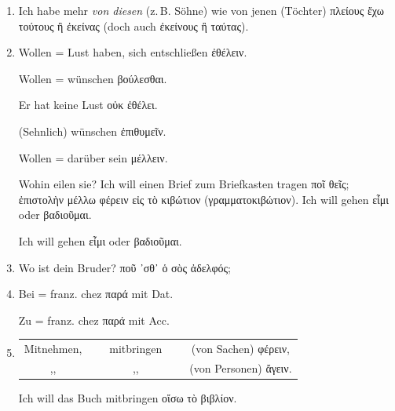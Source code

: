 \begin{enumerate}[leftmargin=0pt,rightmargin=0pt,listparindent =1cm,labelindent=1cm,labelsep=1ex,labelwidth={*},itemindent={*},align=left]
\item Ich habe mehr \emph{von diesen} (z.\,B. Söhne) wie von jenen (Töchter)
\textgreek[variant=ancient]{πλείους ἔχω τούτους ἢ ἐκείνας} (doch auch
\textgreek[variant=ancient]{ἐκείνους ἢ ταύτας}).
\item Wollen = Lust haben, sich entschließen \textgreek[variant=ancient]{ἐθέλειν.}


\begin{continuousitemline}Wollen = wünschen \textgreek[variant=ancient]{βούλεσθαι.}


Er hat keine Lust \textgreek[variant=ancient]{οὐκ ἐθέλει.}


(Sehnlich) wünschen \textgreek[variant=ancient]{ἐπιθυμεῖν. }


Wollen = darüber sein \textgreek[variant=ancient]{μέλλειν.}\par\end{continuousitemline}


Wohin eilen sie? Ich will einen Brief zum Briefkasten tragen \textgreek[variant=ancient]{ποῖ
θεῖς; ἐπιστολὴν μέλλω φέρειν εἰς τὸ κιβώτιον (γραμματοκιβώτιον). Ich
will gehen εἶμι oder βαδιοῦμαι.} 


\begin{continuousitemline}Ich will gehen \textgreek[variant=ancient]{εἶμι}
oder \textgreek[variant=ancient]{βαδιοῦμαι.}\par\end{continuousitemline}

\item Wo ist dein Bruder? \textgreek[variant=ancient]{ποῦ ᾽σθ᾽ ὁ σὸς ἀδελφός;}
\item Bei = franz. \textfrench{chez} \textgreek[variant=ancient]{παρά} mit
\textlatin{Dat.}


\begin{continuousitemline}Zu = franz. \textfrench{chez} \textgreek[variant=ancient]{παρά}
mit \textlatin{Acc.}\par\end{continuousitemline}

\item %
\begin{tabular}[t]{ccccc}
Mitnehmen, & ~ & mitbringen & ~ & (von Sachen) \textgreek[variant=ancient]{φέρειν,}\tabularnewline
,, &  & ,, &  & (von Personen) \textgreek[variant=ancient]{ἄγειν.}\tabularnewline
\end{tabular}


\begin{continuousitemline}Ich will das Buch mitbringen \textgreek[variant=ancient]{οἴσω
τὸ βιβλίον.}



\end{continuousitemline}
\end{enumerate}
